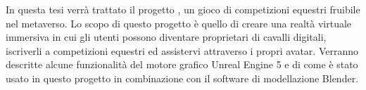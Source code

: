 
In questa tesi verrà trattato il progetto \nomeapp{}, un gioco di competizioni equestri fruibile nel metaverso.
%
Lo scopo di questo progetto è quello di creare una realtà virtuale immersiva in cui gli utenti possono diventare proprietari di cavalli digitali, iscriverli a competizioni equestri ed assistervi attraverso i propri avatar.
%
Verranno descritte alcune funzionalità del motore grafico Unreal Engine 5 e di come è stato usato in questo progetto in combinazione con il software di modellazione Blender.
%




